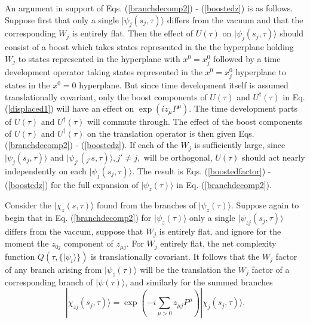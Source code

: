 \documentclass[twocolumn,amsmath,amssymb]{revtex4-1}
\begin{document}
An argument in support of Eqs. (\ref{branchdecomp2}) - (\ref{boostedz}) is as follows.
Suppose first that only a single $|\psi_j(s_j, \tau) \rangle $ differs
from the vacuum and that the corresponding $W_j$ is entirely flat.
Then the effect of $U(\tau)$  on $|\psi_j(s_j, \tau) \rangle $
should consist of a boost which takes states
represented in the 
the hyperplane holding $W_j$ to
states represented in the
hyperplane with $x^0 = x^0_j$ followed by a time development operator
taking states represented in 
the $x^0 = x^0_j$ hyperplane to states in the $x^0 = 0$ hyperplane.
But since time development itself is assumed translationally
covariant, only the boost components of $U( \tau)$ and
$U^\dagger( \tau)$ in Eq. (\ref{displaced1}) will have an effect on
$\exp( i z_\mu P^\mu )$.
 The time development parts of $U( \tau)$ and
$U^\dagger( \tau)$ will commute through.
The effect
of the boost components of $U( \tau)$ and
$U^\dagger( \tau)$ on the
translation operator
is then given Eqs. (\ref{branchdecomp2}) - (\ref{boostedz}).
If each of the $W_j$ is sufficiently large, since
$|\psi_j(s_j, \tau) \rangle $ and $|\psi_{j'}(_{j'}s, \tau) \rangle , j' \ne j,$
will be orthogonal,
$U( \tau)$ should act nearly independently
on each $|\psi_j(s_j, \tau) \rangle $. The result
is Eqs. (\ref{boostedfactor}) - (\ref{boostedz}) for
the full expansion of $|\psi_z(\tau) \rangle $ in Eq. (\ref{branchdecomp2}).

Consider the  $|\chi_z( s, \tau) \rangle $
found from the branches of $|\psi_z( \tau) \rangle $.
Suppose again to begin that in Eq. (\ref{branchdecomp2}) for $|\psi_z( \tau) \rangle $
only a single $|\psi_{zj}( s_j, \tau) \rangle $ differs from the
vaccum, suppose that $W_j$ is entirely flat,
and ignore for the moment the
$z_{0j}$ component of $z_{\mu j}$.
For $W_j$ entirely flat,
the net complexity function $Q( \tau, \{ |\psi_i \rangle  \})$ is
translationally covariant. It follows that
the $W_j$ factor of any
branch arising from $|\psi_z( \tau) \rangle $
will be the translation the $W_j$
factor of a corresponding 
branch of $|\psi( \tau) \rangle $,
and similarly for the summed branches
\begin{equation}
  \label{translatedchi}
   |\chi_{zj}( s_j, \tau) \rangle  = \exp( -i \sum_{ \mu  >  0} z_{\mu j} P^\mu) |\chi_j( s_j, \tau) \rangle .
\end{equation}
\end{document}
